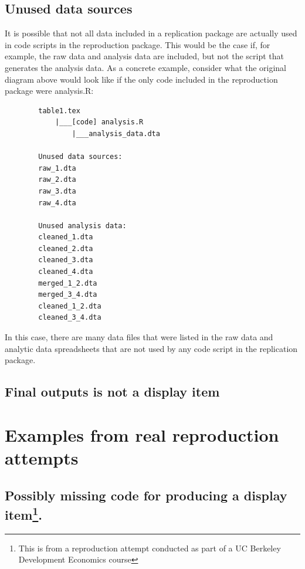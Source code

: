 \documentclass[
]{book}
\begin{document}
\hypertarget{unused-data-sources}{%
\subsection{Unused data sources}\label{unused-data-sources}}

It is possible that not all data included in a replication package are actually used in code scripts in the reproduction package. This would be the case if, for example, the raw data and analysis data are included, but not the script that generates the analysis data. As a concrete example, consider what the original diagram above would look like if the only code included in the reproduction package were analysis.R:

\begin{verbatim}
        table1.tex
            |___[code] analysis.R
                |___analysis_data.dta

        Unused data sources:
        raw_1.dta
        raw_2.dta
        raw_3.dta
        raw_4.dta

        Unused analysis data:
        cleaned_1.dta
        cleaned_2.dta
        cleaned_3.dta
        cleaned_4.dta
        merged_1_2.dta
        merged_3_4.dta
        cleaned_1_2.dta
        cleaned_3_4.dta
\end{verbatim}

In this case, there are many data files that were listed in the raw data and analytic data spreadsheets that are not used by any code script in the replication package.

\hypertarget{final-outputs-is-not-a-display-item}{%
\subsection{Final outputs is not a display item}\label{final-outputs-is-not-a-display-item}}

\hypertarget{examples-from-real-reproduction-attempts}{%
\section{Examples from real reproduction attempts}\label{examples-from-real-reproduction-attempts}}

\hypertarget{possibly-missing-code-for-producing-a-display-item.}{%
\subsection[Possibly missing code for producing a display item.]{\texorpdfstring{Possibly missing code for producing a display item\footnote{This is from a reproduction attempt conducted as part of a UC Berkeley Development Economics course}.}{Possibly missing code for producing a display item.}}\label{possibly-missing-code-for-producing-a-display-item.}}
\end{document}
